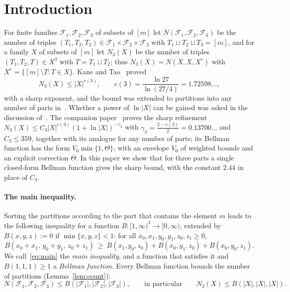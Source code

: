 \documentclass[11pt]{article}
\theoremstyle{definition}
\numberwithin{equation}{section}
\newcommand{\cF}{\mathcal F}
\begin{document}
\section{Introduction}\label{sec:intro}
For finite families $\cF_1,\cF_2,\cF_3$ of subsets of $[m]$ let $N(\cF_1,\cF_2,\cF_3)$ be the number of triples
$(T_1,T_2,T_3)\in\cF_1\times\cF_2\times\cF_3$ with $T_1\sqcup T_2\sqcup T_3=[m]$, and for a family $X$ of subsets of $[m]$ let
$N_3(X)$ be the number of triples $(T_1,T_2,T)\in X^3$ with $T=T_1\sqcup T_2$; thus $N_3(X)=N(X,X,X^c)$ with
$X^c=\{[m]\setminus T:T\in X\}$. Kane and Tao~\cite{KT17} proved
\[
N_3(X)\le|X|^{c(3)},\qquad c(3)=\frac{\ln27}{\ln(27/4)}=1.72598\ldots,
\]
with a sharp exponent, and the bound was extended to partitions into any number of parts in~\cite{Iva17}. Whether a power of
$\ln|X|$ can be gained was asked in the discussion of~\cite{Tao17}. The companion paper~\cite{P} proves the sharp refinement
$N_3(X)\le C_3|X|^{c(3)}(1+\ln|X|)^{-\gamma_3}$ with $\gamma_3=\frac{2-c(3)}2=0.13700\ldots$ and $C_3\le359$, together with its
analogue for any number of parts; its Bellman function has the form $V_0\min\{1,\Theta\}$, with an envelope $V_0$ of weighted
bounds and an explicit correction $\Theta$. In this paper we show that for three parts a single closed-form Bellman function
gives the sharp bound, with the constant $2.44$ in place of $C_3$.

\paragraph{The main inequality.}
Sorting the partitions according to the part that contains the element $m$ leads to the following inequality for a function
$B\colon[1,\infty)^3\to[0,\infty)$, extended by $B(x,y,z):=0$ if $\min\{x,y,z\}<1$: for all $x_0,x_1,y_0,y_1,z_0,z_1\ge0$,
\begin{equation}\label{eq:main}
B(x_0+x_1,\,y_0+y_1,\,z_0+z_1)\ \ge\ B(x_1,y_0,z_0)+B(x_0,y_1,z_0)+B(x_0,y_0,z_1).
\end{equation}
We call~\eqref{eq:main} the \emph{main inequality}, and a function that satisfies it and $B(1,1,1)\ge1$ a \emph{Bellman
function}. Every Bellman function bounds the number of partitions (Lemma~\ref{lem:count}):
\begin{equation}\label{eq:count}
N(\cF_1,\cF_2,\cF_3)\le B(|\cF_1|,|\cF_2|,|\cF_3|),\qquad\text{in particular}\qquad N_3(X)\le B(|X|,|X|,|X|).
\end{equation}
\end{document}
